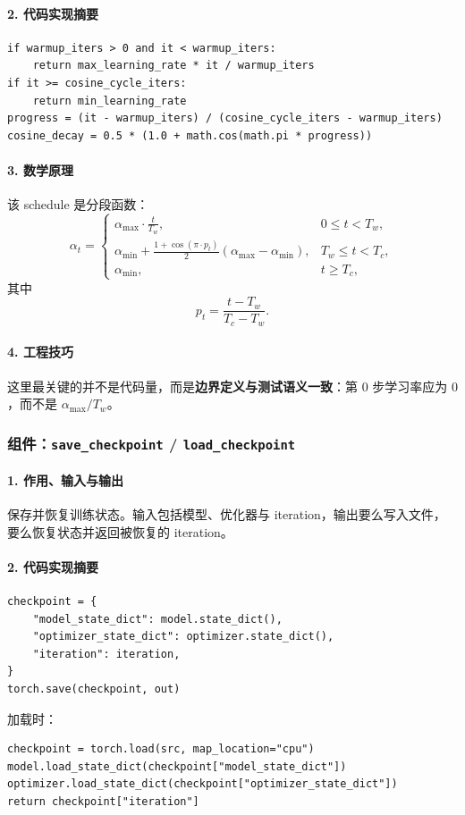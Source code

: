\documentclass[UTF8,a4paper,11pt]{ctexart}
\begin{document}
\paragraph{2. 代码实现摘要}
\begin{lstlisting}
if warmup_iters > 0 and it < warmup_iters:
    return max_learning_rate * it / warmup_iters
if it >= cosine_cycle_iters:
    return min_learning_rate
progress = (it - warmup_iters) / (cosine_cycle_iters - warmup_iters)
cosine_decay = 0.5 * (1.0 + math.cos(math.pi * progress))
\end{lstlisting}

\paragraph{3. 数学原理}
该 schedule 是分段函数：
\[
\alpha_t =
\begin{cases}
\alpha_{\max}\cdot \frac{t}{T_w}, & 0 \le t < T_w, \\
\alpha_{\min} + \frac{1+\cos(\pi \cdot p_t)}{2}(\alpha_{\max}-\alpha_{\min}), & T_w \le t < T_c, \\
\alpha_{\min}, & t \ge T_c,
\end{cases}
\]
其中
\[
p_t = \frac{t-T_w}{T_c-T_w}.
\]

\paragraph{4. 工程技巧}
这里最关键的并不是代码量，而是\textbf{边界定义与测试语义一致}：第 \(0\) 步学习率应为 \(0\)，而不是 \(\alpha_{\max}/T_w\)。

\subsubsection{组件：\texttt{save\_checkpoint} / \texttt{load\_checkpoint}}
\paragraph{1. 作用、输入与输出}
保存并恢复训练状态。输入包括模型、优化器与 iteration，输出要么写入文件，要么恢复状态并返回被恢复的 iteration。

\paragraph{2. 代码实现摘要}
\begin{lstlisting}
checkpoint = {
    "model_state_dict": model.state_dict(),
    "optimizer_state_dict": optimizer.state_dict(),
    "iteration": iteration,
}
torch.save(checkpoint, out)
\end{lstlisting}
加载时：
\begin{lstlisting}
checkpoint = torch.load(src, map_location="cpu")
model.load_state_dict(checkpoint["model_state_dict"])
optimizer.load_state_dict(checkpoint["optimizer_state_dict"])
return checkpoint["iteration"]
\end{lstlisting}
\end{document}
